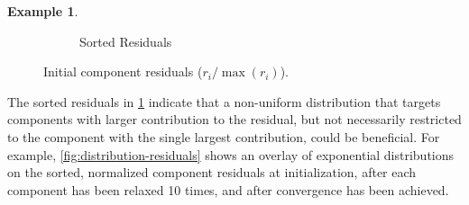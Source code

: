 \documentclass{article}
\theoremstyle{definition}
\theoremstyle{example}
\newtheorem{example}{Example}
\theoremstyle{example}
\theoremstyle{example}
\begin{document}
\begin{example}
\begin{figure}[ht!]
\begin{subfigure}{0.45\textwidth}
			\caption{Sorted Residuals}
			\label{sfig:sorted-residuals}
		\end{subfigure}
		\caption{Initial component residuals ($r_i / \max (r_i)$).}
		\label{fig:initial-residuals-laplacian}
	\end{figure}
\end{example}

The sorted residuals in \cref{sfig:sorted-residuals} indicate that a non-uniform distribution that targets components with larger contribution to the residual, but not necessarily restricted to the component with the single largest contribution, could be beneficial. For example, \cref{fig:distribution-residuals} shows an overlay of exponential distributions on the sorted, normalized component residuals at initialization, after each component has been relaxed 10 times, and after convergence has been achieved.
\end{document}
